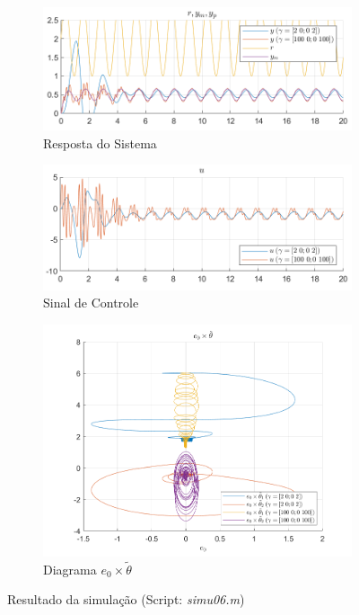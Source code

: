 \documentclass[10pt]{article}
\begin{document}
\begin{figure}[h!]
    \begin{subfigure}[b]{0.35\textwidth}
        \centering
        \includegraphics[width=\textwidth]{img/fig06c.png}
        \caption{Resposta do Sistema}
    \end{subfigure}
    \begin{subfigure}[b]{0.35\textwidth}
        \centering
        \includegraphics[width=\textwidth]{img/fig06e.png}
        \caption{Sinal de Controle}
    \end{subfigure}

    \begin{subfigure}[b]{0.35\textwidth}
        \centering
        \includegraphics[width=\textwidth]{img/fig06d.png}
        \caption{Diagrama $e_0 \times \tilde{\theta}$}
    \end{subfigure}

    \caption{Resultado da simulação (Script: \textit{simu06.m})}
    \label{fig:sim6}
\end{figure}
\end{document}
